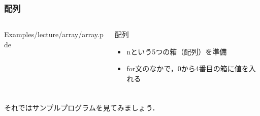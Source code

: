 \documentclass[10pt, dvipdfmx]{beamer}
\begin{document}
        \begin{frame}
            \frametitle{配列}
            \begin{columns}[c]
                \begin{column}{0.50\textwidth}
                    \tiny
                    Examples/lecture/array/array.pde
                    \scriptsize
                \end{column}
                \begin{column}{0.50\textwidth}
                    \begin{block}{配列}
                        \begin{itemize}
                            \item nという5つの箱（配列）を準備
                            \item for文のなかで，0から4番目の箱に値を入れる
                        \end{itemize}
                    \end{block}
                \end{column}
            \end{columns}
        \end{frame}

        \begin{frame}
            \frametitle{}
            \centering
            \large
            それではサンプルプログラムを見てみましょう．
        \end{frame}
\end{document}
